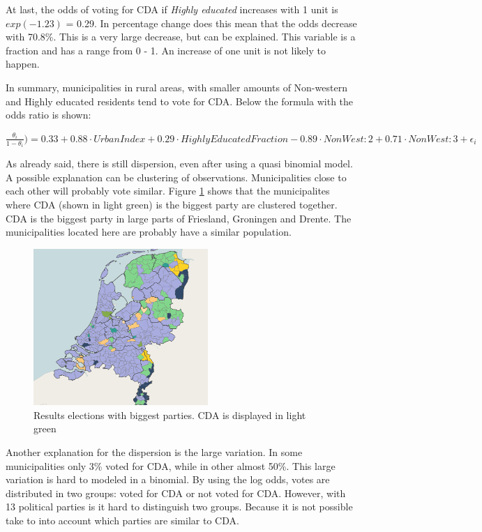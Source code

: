 \documentclass[11pt,]{article}
\begin{document}
At last, the odds of voting for CDA if \emph{Highly educated} increases
with 1 unit is \(exp(-1.23)\) = 0.29. In percentage change does this
mean that the odds decrease with 70.8\%. This is a very large decrease,
but can be explained. This variable is a fraction and has a range from 0
- 1. An increase of one unit is not likely to happen.

In summary, municipalities in rural areas, with smaller amounts of
Non-western and Highly educated residents tend to vote for CDA. Below
the formula with the odds ratio is shown:

\(\frac{\theta_i}{1 - \theta_i}) = 0.33 + 0.88 \cdot UrbanIndex + 0.29 \cdot HighlyEducatedFraction - 0.89 \cdot NonWest:2 + 0.71 \cdot NonWest:3 + \epsilon_i\)

As already said, there is still dispersion, even after using a quasi
binomial model. A possible explanation can be clustering of
observations. Municipalities close to each other will probably vote
similar. Figure \ref{Results elections} shows that the municipalites
where CDA (shown in light green) is the biggest party are clustered
together. CDA is the biggest party in large parts of Friesland,
Groningen and Drente. The municipalities located here are probably have
a similar population.

\begin{figure}
\centering
\includegraphics[width=2.60417in]{Uitslag_verkiezingen2017.png}
\caption{\label{Results elections}Results elections with biggest
parties. CDA is displayed in light green}
\end{figure}

Another explanation for the dispersion is the large variation. In some
municipalities only 3\% voted for CDA, while in other almost 50\%. This
large variation is hard to modeled in a binomial. By using the log odds,
votes are distributed in two groups: voted for CDA or not voted for CDA.
However, with 13 political parties is it hard to distinguish two groups.
Because it is not possible take to into account which parties are
similar to CDA.
\end{document}
